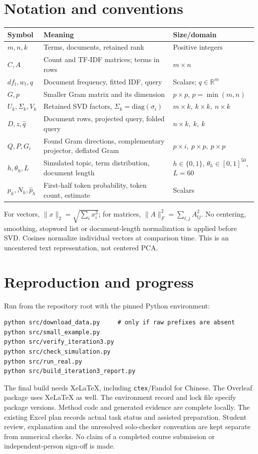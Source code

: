 \documentclass[11pt]{article}
\newcommand{\R}{\mathbb{R}}
\begin{document}
\section{Notation and conventions}
\begin{center}\small
\begin{tabular}{p{}p{}p{}}
\toprule Symbol & Meaning & Size/domain\\\midrule
$m,n,k$ & Terms, documents, retained rank & Positive integers\\
$C,A$ & Count and TF-IDF matrices; terms in rows & $m\times n$\\
$df_t,w_t,q$ & Document frequency, fitted IDF, query & Scalars; $q\in\R^m$\\
$G,p$ & Smaller Gram matrix and its dimension & $p\times p$, $p=\min(m,n)$\\
$U_k,\Sigma_k,V_k$ & Retained SVD factors, $\Sigma_k=\mathrm{diag}(\sigma_i)$ & $m\times k,\ k\times k,\ n\times k$\\
$D,z,\widehat q$ & Document rows, projected query, folded query & $n\times k,\ k,\ k$\\
$Q,P,G_i$ & Found Gram directions, complementary projector, deflated Gram & $p\times i,\ p\times p,\ p\times p$\\
$h,\theta_h,L$ & Simulated topic, term distribution, document length & $h\in\{0,1\}$, $\theta_h\in[0,1]^{50}$, $L=60$\\
$p_h,N_h,\widehat p_h$ & First-half token probability, token count, estimate & Scalars\\
\bottomrule
\end{tabular}\end{center}
For vectors, $\|x\|_2=\sqrt{\sum_i x_i^2}$; for matrices,
$\|A\|_F^2=\sum_{t,j}A_{tj}^2$. No centering, smoothing, stopword list or
document-length normalization is applied before SVD. Cosines normalize
individual vectors at comparison time. This is an uncentered text
representation, not centered PCA.




\section{Reproduction and progress}
Run from the repository root with the pinned Python environment:
\begin{verbatim}
python src/download_data.py     # only if raw prefixes are absent
python src/small_example.py
python src/verify_iteration3.py
python src/check_simulation.py
python src/run_real.py
python src/build_iteration3_report.py
\end{verbatim}
The final build needs XeLaTeX, including \texttt{ctex}/Fandol for Chinese.
The Overleaf package uses XeLaTeX as well. The environment record and
lock file specify package versions.
Method code and generated evidence are complete locally. The existing
Excel plan records actual task status and assisted preparation.
Student review, explanation and the unresolved solo-checker convention
are kept separate from numerical checks. No claim of a completed
course submission or independent-person sign-off is made.
\end{document}
